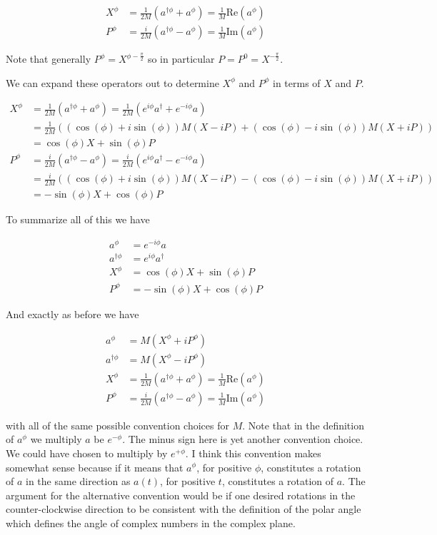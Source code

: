 \documentclass[12pt]{article}
\begin{document}
\begin{align}
X^{\phi} &= \frac{1}{2M}(a^{\dag \phi} + a^{\phi}) = \frac{1}{M}\text{Re}(a^{\phi})\\
P^{\phi} &= \frac{i}{2M}(a^{\dag \phi} - a^{\phi}) = \frac{1}{M} \text{Im}(a^{\phi})
\end{align}

Note that generally $P^{\phi} = X^{\phi - \frac{\pi}{2}}$ so in particular $P = P^0 = X^{-\frac{\pi}{2}}$.

We can expand these operators out to determine $X^{\phi}$ and $P^{\phi}$ in terms of $X$ and $P$.

\begin{align}
X^{\phi} &= \frac{1}{2M}(a^{\dag\phi} + a^{\phi}) = \frac{1}{2M}(e^{i\phi}a^{\dag} + e^{-i\phi}a)\\
&= \frac{1}{2M} \left((\cos(\phi)+i\sin(\phi))M(X-iP) + (\cos(\phi) - i\sin(\phi))M(X+iP)\right)\\
&= \cos(\phi)X + \sin(\phi)P\\
P^{\phi} &= \frac{i}{2M}(a^{\dag\phi} - a^{\phi}) = \frac{i}{2M}(e^{i\phi}a^{\dag} - e^{-i\phi}a)\\
&= \frac{i}{2M} \left((\cos(\phi)+i\sin(\phi))M(X-iP) - (\cos(\phi) - i\sin(\phi))M(X+iP)\right)\\
&= -\sin(\phi)X + \cos(\phi)P
\end{align}

To summarize all of this we have

\begin{align}
a^{\phi} &= e^{-i\phi}a\\
a^{\dag \phi} &= e^{i\phi}a^{\dag}\\
X^{\phi} &= \cos(\phi)X + \sin(\phi)P\\
P^{\phi} &= -\sin(\phi)X + \cos(\phi)P
\end{align}

And exactly as before we have

\begin{align}
a^{\phi} &= M(X^{\phi} + i P^{\phi})\\
a^{\dag \phi} &= M(X^{\phi} - i P^{\phi})\\
X^{\phi} &= \frac{1}{2M}(a^{\dag \phi} + a^{\phi}) = \frac{1}{M}\text{Re}(a^{\phi})\\
P^{\phi} &= \frac{i}{2M}(a^{\dag \phi} - a^{\phi}) = \frac{1}{M} \text{Im}(a^{\phi})
\end{align}

with all of the same possible convention choices for $M$. Note that in the definition of $a^{\phi}$ we multiply $a$ be $e^{-\phi}$. The minus sign here is yet another convention choice. We could have chosen to multiply by $e^{+\phi}$. I think this convention makes somewhat sense because if it means that $a^{\phi}$, for positive $\phi$, constitutes a rotation of $a$ in the same direction as $a(t)$, for positive $t$, constitutes a rotation of $a$. The argument for the alternative convention would be if one desired rotations in the counter-clockwise direction to be consistent with the definition of the polar angle which defines the angle of complex numbers in the complex plane.
\end{document}
